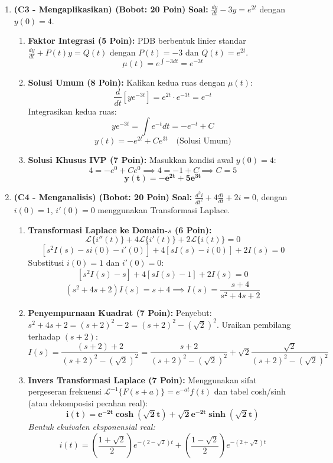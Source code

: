 \documentclass[11pt,a4paper]{article}
\begin{document}
\begin{enumerate}[label=\textbf{Soal \arabic*.}]
    \item \textbf{(C3 - Mengaplikasikan) (Bobot: 20 Poin)}
    \textbf{Soal:} $\frac{dy}{dt} - 3y = e^{2t}$ dengan $y(0) = 4$.
    \begin{tcolorbox}[colback=green!5!white,colframe=green!60!black,title=Solusi Model:]
    \begin{enumerate}
        \item \textbf{Faktor Integrasi (5 Poin):}
        PDB berbentuk linier standar $\frac{dy}{dt} + P(t)y = Q(t)$ dengan $P(t) = -3$ dan $Q(t) = e^{2t}$.
        $$ \mu(t) = e^{\int -3 dt} = e^{-3t} $$
        \item \textbf{Solusi Umum (8 Poin):}
        Kalikan kedua ruas dengan $\mu(t)$:
        $$ \frac{d}{dt}\left[ y e^{-3t} \right] = e^{2t} \cdot e^{-3t} = e^{-t} $$
        Integrasikan kedua ruas:
        $$ y e^{-3t} = \int e^{-t} dt = -e^{-t} + C $$
        $$ y(t) = -e^{2t} + C e^{3t} \quad \text{(Solusi Umum)} $$
        \item \textbf{Solusi Khusus IVP (7 Poin):}
        Masukkan kondisi awal $y(0) = 4$:
        $$ 4 = -e^{0} + C e^{0} \implies 4 = -1 + C \implies C = 5 $$
        $$ \mathbf{y(t) = -e^{2t} + 5e^{3t}} $$
    \end{enumerate}
    \end{tcolorbox}

    \item \textbf{(C4 - Menganalisis) (Bobot: 20 Poin)}
    \textbf{Soal:} $\frac{d^2 i}{dt^2} + 4\frac{di}{dt} + 2i = 0$, dengan $i(0) = 1$, $i'(0) = 0$ menggunakan Transformasi Laplace.
    \begin{tcolorbox}[colback=green!5!white,colframe=green!60!black,title=Solusi Model:]
    \begin{enumerate}
        \item \textbf{Transformasi Laplace ke Domain-$s$ (6 Poin):}
        $$ \mathcal{L}\{i''(t)\} + 4\mathcal{L}\{i'(t)\} + 2\mathcal{L}\{i(t)\} = 0 $$
        $$ [s^2 I(s) - s i(0) - i'(0)] + 4[s I(s) - i(0)] + 2I(s) = 0 $$
        Substitusi $i(0) = 1$ dan $i'(0) = 0$:
        $$ [s^2 I(s) - s] + 4[s I(s) - 1] + 2I(s) = 0 $$
        $$ (s^2 + 4s + 2)I(s) = s + 4 \implies I(s) = \frac{s+4}{s^2 + 4s + 2} $$
        \item \textbf{Penyempurnaan Kuadrat (7 Poin):}
        Penyebut: $s^2 + 4s + 2 = (s+2)^2 - 2 = (s+2)^2 - (\sqrt{2})^2$.
        Uraikan pembilang terhadap $(s+2)$:
        $$ I(s) = \frac{(s+2) + 2}{(s+2)^2 - (\sqrt{2})^2} = \frac{s+2}{(s+2)^2 - (\sqrt{2})^2} + \sqrt{2} \frac{\sqrt{2}}{(s+2)^2 - (\sqrt{2})^2} $$
        \item \textbf{Invers Transformasi Laplace (7 Poin):}
        Menggunakan sifat pergeseran frekuensi $\mathcal{L}^{-1}\{F(s+a)\} = e^{-at}f(t)$ dan tabel cosh/sinh (atau dekomposisi pecahan real):
        $$ \mathbf{i(t) = e^{-2t}\cosh(\sqrt{2}t) + \sqrt{2}e^{-2t}\sinh(\sqrt{2}t)} $$
        \textit{Bentuk ekuivalen eksponensial real:}
        $$ i(t) = \left(\frac{1+\sqrt{2}}{2}\right)e^{-(2-\sqrt{2})t} + \left(\frac{1-\sqrt{2}}{2}\right)e^{-(2+\sqrt{2})t} $$
    \end{enumerate}
    \end{tcolorbox}


\end{enumerate}
\end{document}
